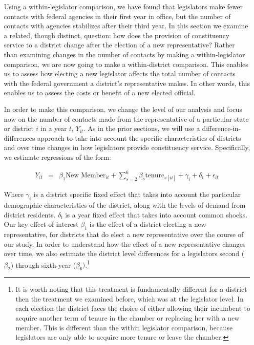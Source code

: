 \documentclass{article}
\begin{document}
Using a within-legislator comparison, we have found that legislators make fewer contacts with federal agencies in their first year in office, but the number of contacts with agencies stabilizes after their third year.  In this section we examine a related, though distinct, question: how does the provision of constituency service to a district change after the election of a new representative?  Rather than examining changes in the number of contacts by making a within-legislator comparison, we are now going to make a within-district comparison.  This enables us to assess how electing a new legislator affects the total number of contacts with the federal government a district's representative makes.  In other words, this enables us to assess the costs or benefit of a new elected official.    


In order to make this comparison, we change the level of our analysis and focus now on the number of contacts made from the representative of a particular state or district $i$ in a year $t$, $Y_{it}$.  As in the prior sections, we will use a difference-in-differences approach to take into account the specific characteristics of districts and over time changes in how legislators provide constituency service.  Specifically, we estimate regressions of the form: 


\begin{eqnarray}
Y_{it} & = & \beta_{1}\text{New Member}_{it} + \sum_{s = 2}^{6} \beta_{s} \text{tenure}_{s[it]} + \gamma_{i} + \delta_{t} + \epsilon_{it} \label{e:district1} 
\end{eqnarray}

Where $\gamma_{i}$ is a district specific fixed effect that takes into account the particular demographic characteristics of the district, along with the levels of demand from district residents.  $\delta_{t}$ is a year fixed effect that takes into account common shocks.  Our key effect of interest $\beta_{1}$ is the effect of a district electing a new representative, for districts that do elect a new representative over the course of our study.  In order to understand how the effect of a new representative changes over time, we also estimate the district level differences for a legislators second ($\beta_{2}$) through sixth-year ($\beta_{6})$.\footnote{It is worth noting that this treatment is fundamentally different for a district then the treatment we examined before, which was at the legislator level.  In each election the district faces the choice of either allowing their incumbent to acquire another term of tenure in the chamber or replacing her with a new member.  This is different than the within legislator comparison, because legislators are only able to acquire more tenure or leave the chamber.}
\end{document}
